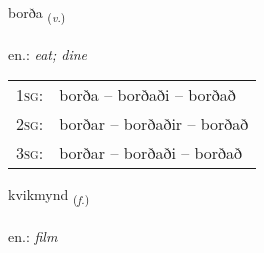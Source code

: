 \documentclass[frontgrid, backgrid]{flacards}\usepackage[]{graphicx}\usepackage[]{xcolor}
\begin{document}
\renewcommand{\flhead}{\vskip5pt \fboxsep=0pt {\small\bfseries\footnotesize Sagnorð | Verb}}
\renewcommand{\fcfoot}{\vskip5pt \fboxsep=0pt \hspace{2pt}{\small\bfseries\footnotesize 1K}}

\renewcommand{\blhead}{\vskip5pt {\small\bfseries\footnotesize Sagnorð | Verb }}
\renewcommand{\bcfoot}{\vskip5pt \hspace{2pt}{\small\bfseries\footnotesize 1K}}


{borða \small{\textsubscript{(\textit{v.})}} \\[1ex] %
\textphonetic{[pɔrða]} \\
en.: \emph{eat; dine} \\  [2ex]
\renewcommand*{\arraystretch}{0.8}
\begin{tabular}{p{1cm}l}
\textsc{1sg}: & borða -- borðaði -- borðað \\ 
\textsc{2sg}: & borðar -- borðaðir -- borðað \\ 
\textsc{3sg}: & borðar -- borðaði -- borðað \\ 
\end{tabular}
}

\renewcommand{\flhead}{\vskip5pt \fboxsep=0pt {\small\bfseries\footnotesize Nafnorð | Noun}}
\renewcommand{\fcfoot}{\vskip5pt \fboxsep=0pt \hspace{2pt}{\small\bfseries\footnotesize 1K}}

\renewcommand{\blhead}{\vskip5pt {\small\bfseries\footnotesize Nafnorð | Noun }}
\renewcommand{\bcfoot}{\vskip5pt \hspace{2pt}{\small\bfseries\footnotesize 1K}}


{kvikmynd \small{\textsubscript{(\textit{f.})}} \\[1ex] %
\textphonetic{[kʰvɪːkmɪnt]} \\
en.: \emph{film} \\  [2ex]
\renewcommand*{\arraystretch}{0.8}
}
\end{document}

